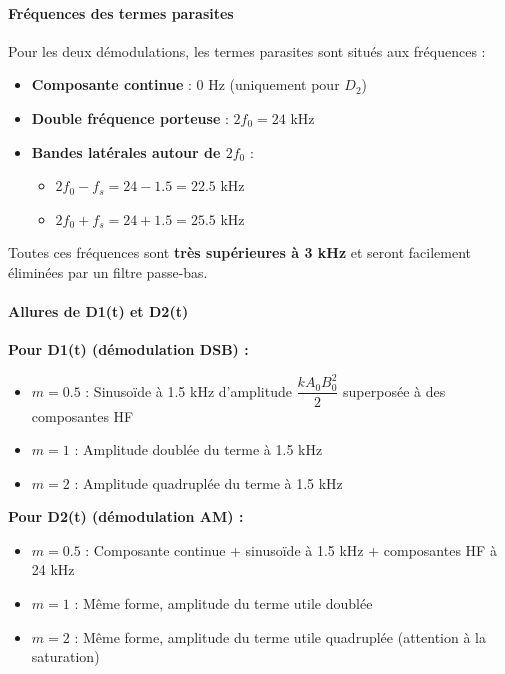 \documentclass[11pt,a4paper]{article}
\begin{document}
\paragraph{Fréquences des termes parasites}

Pour les deux démodulations, les termes parasites sont situés aux fréquences :

\begin{itemize}
    \item \textbf{Composante continue} : 0 Hz (uniquement pour $D_2$)
    \item \textbf{Double fréquence porteuse} : $2f_0 = 24$ kHz
    \item \textbf{Bandes latérales autour de $2f_0$} :
    \begin{itemize}
        \item $2f_0 - f_s = 24 - 1.5 = 22.5$ kHz
        \item $2f_0 + f_s = 24 + 1.5 = 25.5$ kHz
    \end{itemize}
\end{itemize}

Toutes ces fréquences sont \textbf{très supérieures à 3 kHz} et seront facilement éliminées par un filtre passe-bas.

\paragraph{Allures de D1(t) et D2(t)}

\textbf{Pour D1(t) (démodulation DSB) :}
\begin{itemize}
    \item \textbf{$m = 0.5$} : Sinusoïde à 1.5 kHz d'amplitude $\dfrac{k A_0 B_0^2}{2}$ superposée à des composantes HF
    \item \textbf{$m = 1$} : Amplitude doublée du terme à 1.5 kHz
    \item \textbf{$m = 2$} : Amplitude quadruplée du terme à 1.5 kHz
\end{itemize}

\textbf{Pour D2(t) (démodulation AM) :}
\begin{itemize}
    \item \textbf{$m = 0.5$} : Composante continue + sinusoïde à 1.5 kHz + composantes HF à 24 kHz
    \item \textbf{$m = 1$} : Même forme, amplitude du terme utile doublée
    \item \textbf{$m = 2$} : Même forme, amplitude du terme utile quadruplée (attention à la saturation)
\end{itemize}
\end{document}
